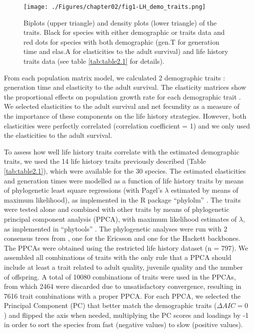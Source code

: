 \begin{figure}
\centering
\texttt{[image: ./Figures/chapter02/fig1-LH\_demo\_traits.png]}
\caption[Traits distribution]{
Biplots (upper triangle) and density plots (lower triangle) of the traits. 
Black for species with either demographic or traits data and red dots for 
species with both demographic (gen.T for generation time and elas.A for 
elasticities to the adult survival) and life history traits data (see table
\ref{tab:table2.1} for details).}
\label{fig:fig2.1}
\end{figure}

From each population matrix model, we calculated 2 demographic 
traits \citep{Caswell2001,Stubben2007}: generation time and elasticity to the
adult survival. The elasticity matrices show the proportional effects on 
population growth rate for each demographic trait \citep{deKroon2000}⁠. We 
selected elasticities to the adult survival and net fecundity as a measure of
the importance of these components on the life history strategies. However, both
elasticities were perfectly correlated (correlation coefficient = 1) and we only 
used the elasticities to the adult survival.

To assess how well life history traits correlate with the estimated demographic 
traits, we used the 14 life history traits previously described (Table 
\ref{tab:table2.1}), which were available for the 30 species. The estimated 
elasticities and generation times were modelled as a function of life history 
traits by means of phylogenetic least square regressions (with Pagel’s 
$\lambda$ estimated by means of maximum likelihood), as implemented in the R 
package “phylolm” \citep{Ho2014}⁠. The traits were tested alone and combined 
with other traits by means of phylogenetic principal component analysis 
(PPCA), with maximum likelihood estimates of $\lambda$, as implemented in 
“phytools” \citep{Revell2009a}⁠. The phylogenetic analyses were run with 
2 consensus trees from \citet{Jetz2012}, one for the Ericsson and 
one for the Hackett backbones.
The PPCAs were obtained using the restricted life history dataset (n = 797). We 
assembled all combinations of traits with the only rule that a PPCA should 
include at least a trait related to adult quality, juvenile quality and the 
number of offspring. A total of 10080 combinations of traits were used in the 
PPCAs, from which 2464 were discarded due to unsatisfactory convergence, 
resulting in 7616 trait combinations with a proper PPCA. For each PPCA, we 
selected the Principal Component (PC) that better match the demographic traits 
($\Delta AIC = 0$) and flipped the axis when needed, multiplying the PC scores
and loadings by -1 in order to sort the species from fast (negative values) to
slow (positive values).

